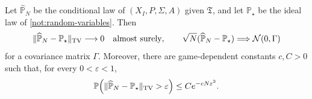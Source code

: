 \documentclass[12pt, a4paper]{article}
\begin{document}
\begin{lemma}\label{lem:terminal-rollout-decision-law-convergence}
Let $\widehat{\mathbb P}_N$ be the conditional law of $(X_I,P,\Sigma,A)$ given $\mathfrak T$, and let $\mathbb P_\star$ be the ideal law of \autoref{not:random-variables}. Then
\[
  \|\widehat{\mathbb P}_N-\mathbb P_\star\|_{\rm TV}\longrightarrow 0
  \quad\textnormal{almost surely},
  \qquad
  \sqrt N(\widehat{\mathbb P}_N-\mathbb P_\star)\Longrightarrow\mathcal N(0,\Gamma)
\]
for a covariance matrix $\Gamma$. Moreover, there are game-dependent constants $c,C>0$ such that, for every $0<\varepsilon<1$,
\[
  \mathbb P\!\left(\|\widehat{\mathbb P}_N-\mathbb P_\star\|_{\rm TV}>\varepsilon\right)
  \leq C e^{-cN\varepsilon^2}.
\]
\end{lemma}
\end{document}

